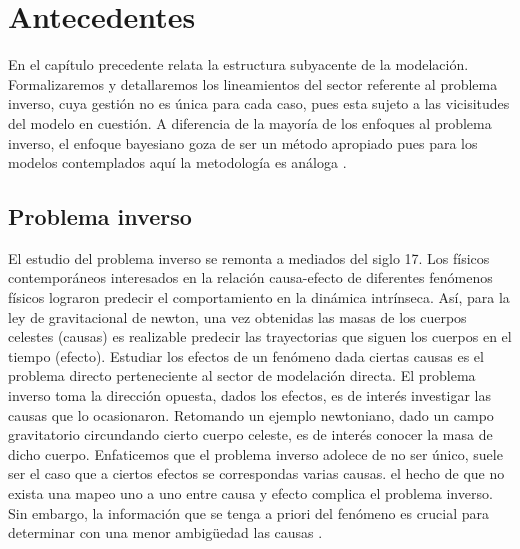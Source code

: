 
\chapter{Antecedentes}

En el capítulo precedente relata la estructura subyacente de la modelación. Formalizaremos y detallaremos los lineamientos  del sector referente al problema inverso, cuya gestión no es única para cada caso, pues esta sujeto a las vicisitudes del modelo en cuestión. A diferencia de la mayoría de los enfoques al problema inverso, el enfoque bayesiano goza de ser un método apropiado pues para los modelos contemplados aquí la metodología es análoga \cite{tarantola2005inverse}.



\section{Problema inverso}

El estudio del problema inverso se remonta a mediados del siglo 17. Los físicos contemporáneos interesados en la relación causa-efecto de diferentes fenómenos físicos lograron predecir el comportamiento en la dinámica intrínseca. Así, para la ley de gravitacional de newton, una vez obtenidas las masas de los cuerpos celestes (causas) es realizable predecir las trayectorias que siguen los cuerpos en el tiempo (efecto). Estudiar los efectos de un fenómeno dada ciertas causas es el problema directo perteneciente al sector de modelación directa. El problema inverso toma la dirección opuesta, dados los efectos, es de interés investigar las causas que lo ocasionaron. Retomando un ejemplo newtoniano, dado un campo gravitatorio circundando cierto cuerpo celeste, es de interés conocer la masa de dicho cuerpo. Enfaticemos que el problema inverso adolece de no ser único, suele ser el caso que a ciertos efectos se correspondas varias causas. el hecho de que no exista una mapeo uno a uno entre causa y efecto complica el problema inverso. Sin embargo, la información que se tenga a priori del fenómeno es crucial para determinar con una menor ambigüedad las causas \cite{tarantola2005inverse}. 

